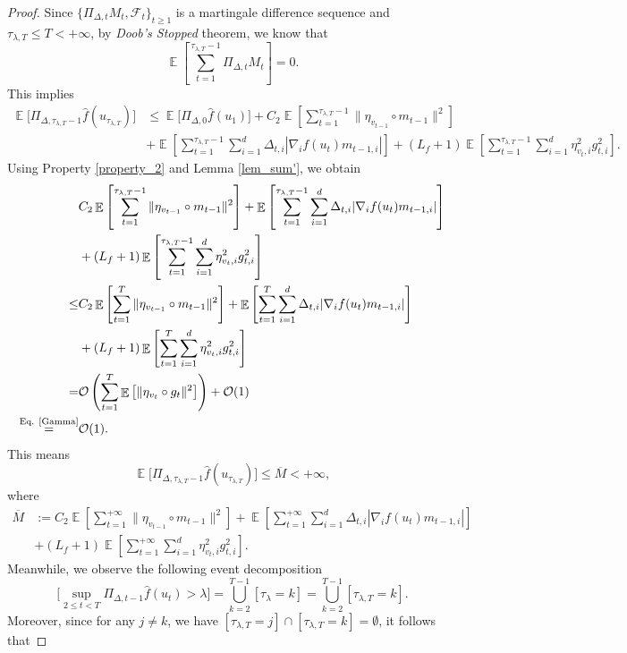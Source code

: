 \documentclass{article} %
\DeclareMathOperator{\Expect}{\mathbb{E}}
\begin{document}
\begin{proof}
Since $\{\Pi_{\Delta,t}M_{t}, \mathscr{F}_{t}\}_{t \geq 1}$ is a martingale difference sequence and $\tau_{\lambda,T} \le  T<+\infty$, by \emph{Doob's Stopped} theorem, we know that
\[\Expect\left[\sum_{t=1}^{\tau_{\lambda,T}-1}\Pi_{\Delta,t}M_{t}\right]=0.\]
This implies
\begin{align*}
\Expect\Big[\Pi_{\Delta,\tau_{\lambda,T}-1}\hat{f}(u_{\tau_{\lambda,T}})\Big]&\le \Expect\Big[\Pi_{\Delta,0}\hat{f}(u_{1})\Big]+C_{2}\Expect\left[\sum_{t=1}^{\tau_{\lambda,T}-1}\|{\eta_{v_{t-1}}}\circ m_{t-1}\|^{2}\right]\\&+\Expect\left[\sum_{t=1}^{\tau_{\lambda,T}-1}\sum_{i=1}^{d}\Delta_{t,i}|\nabla_{i} f(u_{t})m_{t-1,i}|\right]+(L_{f}+1)\Expect\left[\sum_{t=1}^{\tau_{\lambda,T}-1}\sum_{i=1}^{d}\eta_{v_{t},i}^{2}g_{t,i}^{2}\right].
\end{align*}
Using Property \ref{property_2} and Lemma \ref{lem_sum'}, we obtain
\begin{align*}
 &C_{2}\Expect\left[\sum_{t=1}^{\tau_{\lambda,T}-1}\|{\eta_{v_{t-1}}}\circ m_{t-1}\|^{2}\right]+\Expect\left[\sum_{t=1}^{\tau_{\lambda,T}-1}\sum_{i=1}^{d}\Delta_{t,i}|\nabla_{i} f(u_{t})m_{t-1,i}|\right]\\&+(L_{f}+1)\Expect\left[\sum_{t=1}^{\tau_{\lambda,T}-1}\sum_{i=1}^{d}\eta_{v_{t},i}^{2}g_{t,i}^{2}\right]\\ \le& C_{2}\Expect\left[\sum_{t=1}^{T}\|{\eta_{v_{t-1}}}\circ m_{t-1}\|^{2}\right]+\Expect\left[\sum_{t=1}^{T}\sum_{i=1}^{d}\Delta_{t,i}|\nabla_{i} f(u_{t})m_{t-1,i}|\right]\\&+(L_{f}+1)\Expect\left[\sum_{t=1}^{T}\sum_{i=1}^{d}\eta_{v_{t},i}^{2}g_{t,i}^{2}\right] \\= & \mathcal{O}\left(\sum_{t=1}^{T}\Expect\left[\|\eta_{v_{t}}\circ g_{t}\|^{2}\right]\right)+\mathcal{O}(1)\\\mathop{=}^{\text{Eq. \ref{Gamma}}} &\mathcal{O}(1).
\end{align*}
This means
\[\Expect\Big[\Pi_{\Delta,\tau_{\lambda,T}-1}\hat{f}(u_{\tau_{\lambda,T}})\Big]\le \overline{M}<+\infty,\]
where \begin{align*}
\overline{M}&:=C_{2}\Expect\left[\sum_{t=1}^{+\infty}\|{\eta_{v_{t-1}}}\circ m_{t-1}\|^{2}\right]+\Expect\left[\sum_{t=1}^{+\infty}\sum_{i=1}^{d}\Delta_{t,i}|\nabla_{i} f(u_{t})m_{t-1,i}|\right]\\&+(L_{f}+1)\Expect\left[\sum_{t=1}^{+\infty}\sum_{i=1}^{d}\eta_{v_{t},i}^{2}g_{t,i}^{2}\right].
\end{align*}
Meanwhile, we observe the following event decomposition
\[\Big[\sup_{2\le t<T}\Pi_{\Delta,t-1}\hat{f}(u_{t})>\lambda\Big]=\bigcup_{k=2}^{T-1}[\tau_{\lambda}=k]=\bigcup_{k=2}^{T-1}[\tau_{\lambda,T}=k].\] Moreover, since for any $j \neq k$, we have $[\tau_{\lambda,T} = j] \cap [\tau_{\lambda,T} = k] = \emptyset$, it follows that

\end{proof}
\end{document}

